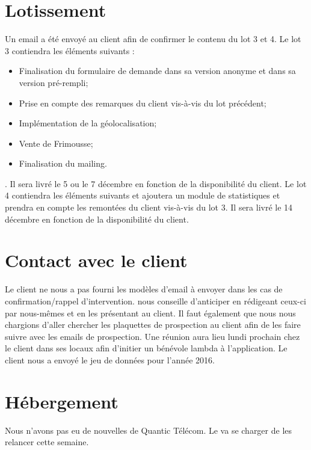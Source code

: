 \documentclass [a4paper] {article}
\begin{document}
\section{Lotissement}
	Un email a été envoyé au client afin de confirmer le contenu du lot 3 et 4. 
Le lot 3 contiendra les éléments suivants :
\begin{itemize}
	\item Finalisation du formulaire de demande dans sa version anonyme et dans sa version pré-rempli;
	\item Prise en compte des remarques du client vis-à-vis du lot précédent;
	\item Implémentation de la géolocalisation;
	\item Vente de Frimousse;
	\item Finalisation du mailing.
\end{itemize} . Il sera livré le 5 ou le 7 décembre en fonction de la disponibilité du client.
Le lot 4 contiendra les éléments suivants et ajoutera un module de statistiques et prendra en compte les remontées du client vis-à-vis du lot 3.
Il sera livré le 14 décembre en fonction de la disponibilité du client.

\section{Contact avec le client}
Le client ne nous a pas fourni les modèles d'email à envoyer dans les cas de confirmation/rappel d'intervention. \nomTuteurPedago{} nous conseille d'anticiper en rédigeant ceux-ci par nous-mêmes et en les présentant au client. Il faut également que nous nous chargions d'aller chercher les plaquettes de prospection au client afin de les faire suivre avec les emails de prospection. 
Une réunion aura lieu lundi prochain chez le client dans ses locaux afin d'initier un bénévole lambda à l'application.
Le client nous a envoyé le jeu de données pour l'année 2016.

\section{Hébergement}
Nous n'avons pas eu de nouvelles de Quantic Télécom. Le \CP{} va se charger de les relancer cette semaine.
\newpage
\end{document}
